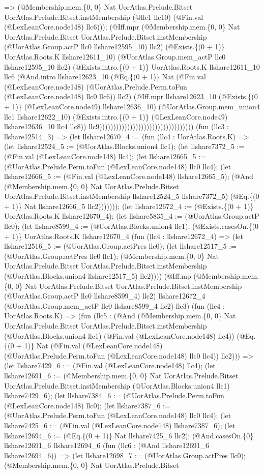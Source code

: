 \documentclass[11pt]{article}
\begin{document}
=> (@Membership.mem.\{0, 0\} Nat UorAtlas.Prelude.Bitset UorAtlas.Prelude.Bitset.instMembership (@llc1 llc10) (@Fin.val (@LexLeanCore.node148) llc6))); (@Iff.mpr (@Membership.mem.\{0, 0\} Nat UorAtlas.Prelude.Bitset UorAtlas.Prelude.Bitset.instMembership (@UorAtlas.Group.actP llc0 llshare12595\_10) llc2) (@Exists.\{(0 + 1)\} UorAtlas.Roots.K llshare12611\_10) (@UorAtlas.Group.mem\_actP llc0 llshare12595\_10 llc2) (@Exists.intro.\{(0 + 1)\} UorAtlas.Roots.K llshare12611\_10 llc6 (@And.intro llshare12623\_10 (@Eq.\{(0 + 1)\} Nat (@Fin.val (@LexLeanCore.node148) (@UorAtlas.Prelude.Perm.toFun (@LexLeanCore.node148) llc0 llc6)) llc2) (@Iff.mpr llshare12623\_10 (@Exists.\{(0 + 1)\} (@LexLeanCore.node49) llshare12636\_10) (@UorAtlas.Group.mem\_union4 llc1 llshare12622\_10) (@Exists.intro.\{(0 + 1)\} (@LexLeanCore.node49) llshare12636\_10 llc4 llc8)) llc9)))))))))))))))))))))))))))))))))) (fun (llc3 : llshare12514\_3) => (let llshare12670\_4 := (fun (llc4 : UorAtlas.Roots.K) => (let llshare12524\_5 := (@UorAtlas.Blocks.union4 llc1); (let llshare7372\_5 := (@Fin.val (@LexLeanCore.node148) llc4); (let llshare12665\_5 := (@UorAtlas.Prelude.Perm.toFun (@LexLeanCore.node148) llc0 llc4); (let llshare12666\_5 := (@Fin.val (@LexLeanCore.node148) llshare12665\_5); (@And (@Membership.mem.\{0, 0\} Nat UorAtlas.Prelude.Bitset UorAtlas.Prelude.Bitset.instMembership llshare12524\_5 llshare7372\_5) (@Eq.\{(0 + 1)\} Nat llshare12666\_5 llc2))))))); (let llshare12672\_4 := (@Exists.\{(0 + 1)\} UorAtlas.Roots.K llshare12670\_4); (let llshare5835\_4 := (@UorAtlas.Group.actP llc0); (let llshare8599\_4 := (@UorAtlas.Blocks.union4 llc1); (@Exists.casesOn.\{(0 + 1)\} UorAtlas.Roots.K llshare12670\_4 (fun (llc4 : llshare12672\_4) => (let llshare12516\_5 := (@UorAtlas.Group.actPres llc0); (let llshare12517\_5 := (@UorAtlas.Group.actPres llc0 llc1); (@Membership.mem.\{0, 0\} Nat UorAtlas.Prelude.Bitset UorAtlas.Prelude.Bitset.instMembership (@UorAtlas.Blocks.union4 llshare12517\_5) llc2)))) (@Iff.mp (@Membership.mem.\{0, 0\} Nat UorAtlas.Prelude.Bitset UorAtlas.Prelude.Bitset.instMembership (@UorAtlas.Group.actP llc0 llshare8599\_4) llc2) llshare12672\_4 (@UorAtlas.Group.mem\_actP llc0 llshare8599\_4 llc2) llc3) (fun (llc4 : UorAtlas.Roots.K) => (fun (llc5 : (@And (@Membership.mem.\{0, 0\} Nat UorAtlas.Prelude.Bitset UorAtlas.Prelude.Bitset.instMembership (@UorAtlas.Blocks.union4 llc1) (@Fin.val (@LexLeanCore.node148) llc4)) (@Eq.\{(0 + 1)\} Nat (@Fin.val (@LexLeanCore.node148) (@UorAtlas.Prelude.Perm.toFun (@LexLeanCore.node148) llc0 llc4)) llc2))) => (let llshare7429\_6 := (@Fin.val (@LexLeanCore.node148) llc4); (let llshare12691\_6 := (@Membership.mem.\{0, 0\} Nat UorAtlas.Prelude.Bitset UorAtlas.Prelude.Bitset.instMembership (@UorAtlas.Blocks.union4 llc1) llshare7429\_6); (let llshare7384\_6 := (@UorAtlas.Prelude.Perm.toFun (@LexLeanCore.node148) llc0); (let llshare7387\_6 := (@UorAtlas.Prelude.Perm.toFun (@LexLeanCore.node148) llc0 llc4); (let llshare7425\_6 := (@Fin.val (@LexLeanCore.node148) llshare7387\_6); (let llshare12694\_6 := (@Eq.\{(0 + 1)\} Nat llshare7425\_6 llc2); (@And.casesOn.\{0\} llshare12691\_6 llshare12694\_6 (fun (llc6 : (@And llshare12691\_6 llshare12694\_6)) => (let llshare12698\_7 := (@UorAtlas.Group.actPres llc0); (@Membership.mem.\{0, 0\} Nat UorAtlas.Prelude.Bitset 
\end{document}
